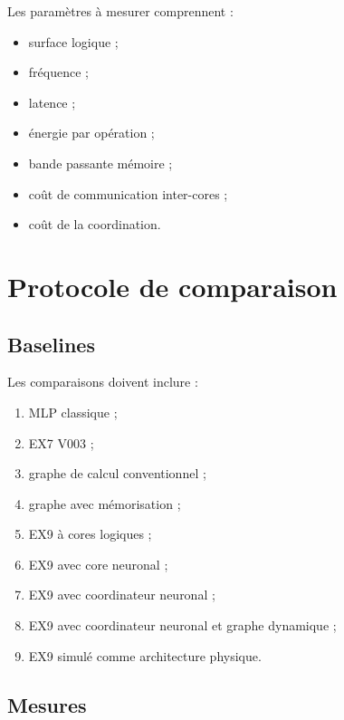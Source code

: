 \documentclass[11pt,a4paper]{article}
\begin{document}
Les paramètres à mesurer comprennent :
\begin{itemize}
  \item surface logique ;
  \item fréquence ;
  \item latence ;
  \item énergie par opération ;
  \item bande passante mémoire ;
  \item coût de communication inter-cores ;
  \item coût de la coordination.
\end{itemize}

\section{Protocole de comparaison}

\subsection{Baselines}

Les comparaisons doivent inclure :

\begin{enumerate}
  \item MLP classique ;
  \item EX7 V003 ;
  \item graphe de calcul conventionnel ;
  \item graphe avec mémorisation ;
  \item EX9 à cores logiques ;
  \item EX9 avec core neuronal ;
  \item EX9 avec coordinateur neuronal ;
  \item EX9 avec coordinateur neuronal et graphe dynamique ;
  \item EX9 simulé comme architecture physique.
\end{enumerate}

\subsection{Mesures}
\end{document}
